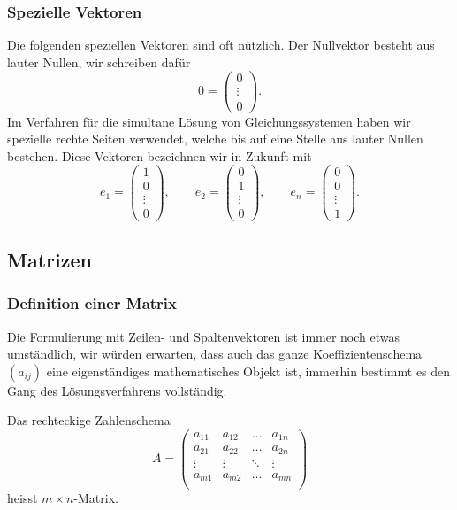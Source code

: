 \subsubsection{Spezielle Vektoren\label{speziellevektoren}}
Die folgenden speziellen Vektoren sind oft nützlich.
Der Nullvektor besteht
aus lauter Nullen, wir schreiben dafür
\[
0=\begin{pmatrix}0\\\vdots\\0\end{pmatrix}.
\]
Im Verfahren für die simultane Lösung von Gleichungssystemen haben
wir spezielle rechte Seiten verwendet, welche bis auf eine Stelle aus lauter
Nullen bestehen.
Diese Vektoren bezeichnen wir in Zukunft mit
\[
e_1=\begin{pmatrix}1\\0\\\vdots\\0\end{pmatrix},
\qquad
e_2=\begin{pmatrix}0\\1\\\vdots\\0\end{pmatrix},
\qquad
e_n=\begin{pmatrix}0\\0\\\vdots\\1\end{pmatrix}.
\]

\subsection{Matrizen\label{skript:subsection:matrizen}}
\subsubsection{Definition einer Matrix}
Die Formulierung mit Zeilen- und Spaltenvektoren ist immer noch etwas umständlich,
wir würden erwarten, dass auch das ganze Koeffizientenschema $(a_{ij})$
eine eigenständiges mathematisches Objekt ist, immerhin bestimmt es den
Gang des Lösungsverfahrens vollständig.

\begin{definition}
Das rechteckige Zahlenschema
\[
A=
\begin{pmatrix}
a_{11}&a_{12}&\dots&a_{1n}\\
a_{21}&a_{22}&\dots&a_{2n}\\
\vdots&\vdots&\ddots&\vdots\\
a_{m1}&a_{m2}&\dots&a_{mn}\\
\end{pmatrix}
\]
heisst $m\times n$-Matrix.
\end{definition}

